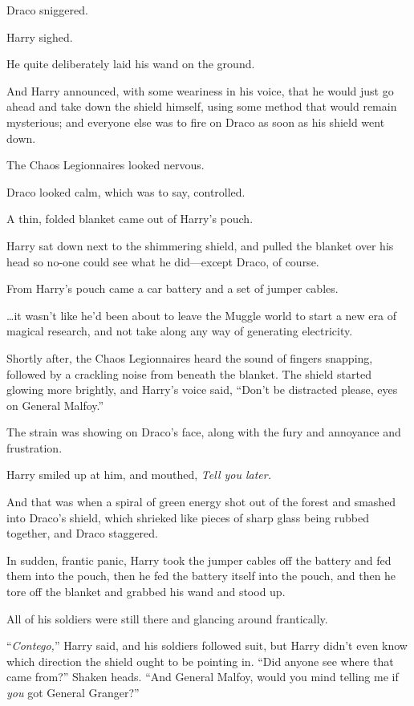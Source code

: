 Draco sniggered.

Harry sighed.

He quite deliberately laid his wand on the ground.

And Harry announced, with some weariness in his voice, that he would just go ahead and take down the shield himself, using some method that would remain mysterious; and everyone else was to fire on Draco as soon as his shield went down.

The Chaos Legionnaires looked nervous.

Draco looked calm, which was to say, controlled.

A thin, folded blanket came out of Harry’s pouch.

Harry sat down next to the shimmering shield, and pulled the blanket over his head so no-one could see what he did—except Draco, of course.

From Harry’s pouch came a car battery and a set of jumper cables.

…it wasn’t like he’d been about to leave the Muggle world to start a new era of magical research, and not take along any way of generating electricity.

Shortly after, the Chaos Legionnaires heard the sound of fingers snapping, followed by a crackling noise from beneath the blanket. The shield started glowing more brightly, and Harry’s voice said, “Don’t be distracted please, eyes on General Malfoy.”

The strain was showing on Draco’s face, along with the fury and annoyance and frustration.

Harry smiled up at him, and mouthed, \emph{Tell you later.}

And that was when a spiral of green energy shot out of the forest and smashed into Draco’s shield, which shrieked like pieces of sharp glass being rubbed together, and Draco staggered.

In sudden, frantic panic, Harry took the jumper cables off the battery and fed them into the pouch, then he fed the battery itself into the pouch, and then he tore off the blanket and grabbed his wand and stood up.

All of his soldiers were still there and glancing around frantically.

“\emph{Contego,}” Harry said, and his soldiers followed suit, but Harry didn’t even know which direction the shield ought to be pointing in. “Did anyone see where that came from?” Shaken heads. “And General Malfoy, would you mind telling me if \emph{you} got General Granger?”

